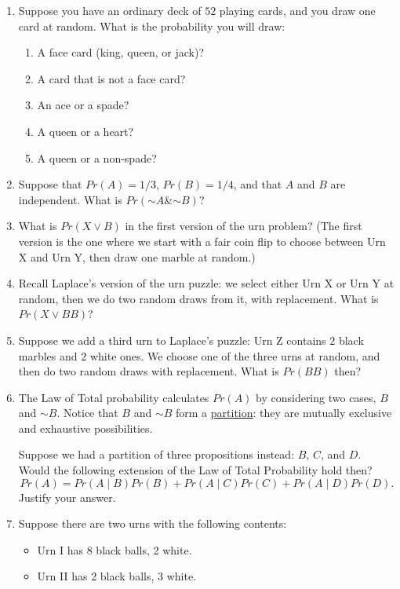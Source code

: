 \documentclass[justified]{tufte-book}
\providecommand{\tightlist}{%
  \setlength{\itemsep}{0pt}\setlength{\parskip}{0pt}}
\newcommand{\given}{\mid}
\renewcommand{\neg}{\mathbin{\sim}}
\renewcommand{\wedge}{\mathbin{\&}}
\newcommand{\p}{Pr}
\theoremstyle{definition}
\theoremstyle{definition}
\theoremstyle{definition}
\theoremstyle{definition}
\theoremstyle{remark}
\begin{document}
\begin{enumerate}
\item
  Suppose you have an ordinary deck of \(52\) playing cards, and you draw one card at random. What is the probability you will draw:

  \begin{enumerate}
  \def\labelenumii{\alph{enumii}.}
  \tightlist
  \item
    A face card (king, queen, or jack)?
  \item
    A card that is not a face card?
  \item
    An ace or a spade?
  \item
    A queen or a heart?
  \item
    A queen or a non-spade?
  \end{enumerate}
\item
  Suppose that \(Pr(A)=1/3\), \(Pr(B) = 1/4\), and that \(A\) and \(B\) are independent. What is \(\p(\neg A \wedge \neg B)\)?
\item
  What is \(\p(X \vee B)\) in the first version of the urn problem? (The first version is the one where we start with a fair coin flip to choose between Urn X and Urn Y, then draw one marble at random.)
\item
  Recall Laplace's version of the urn puzzle: we select either Urn X or Urn Y at random, then we do two random draws from it, with replacement. What is \(\p(X \vee BB)\)?
\item
  Suppose we add a third urn to Laplace's puzzle: Urn Z contains \(2\) black marbles and \(2\) white ones. We choose one of the three urns at random, and then do two random draws with replacement. What is \(\p(BB)\) then?
\item
  The Law of Total probability calculates \(\p(A)\) by considering two cases, \(B\) and \(\neg B\). Notice that \(B\) and \(\neg B\) form a \protect\hyperlink{lessons}{partition}: they are mutually exclusive and exhaustive possibilities.

  Suppose we had a partition of three propositions instead: \(B\), \(C\), and \(D\). Would the following extension of the Law of Total Probability hold then?
  \[\p(A) = \p(A \given B)\p(B) + \p(A \given C)\p(C) + \p(A \given D)\p(D).\]
  Justify your answer.
\item
  Suppose there are two urns with the following contents:

  \begin{itemize}
  \tightlist
  \item
    Urn I has 8 black balls, 2 white.
  \item
    Urn II has 2 black balls, 3 white.
  \end{itemize}


\end{enumerate}
\end{document}
